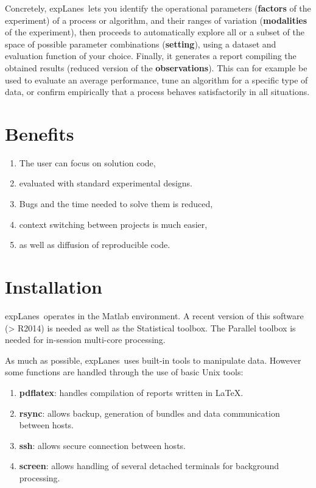 \documentclass[a4paper,fleqn]{tufte-handout}
\newcommand{\explanes}{\textsf{expLanes}\ }
\begin{document}
Concretely, \explanes lets you identify the operational parameters (\textbf{factors} of the experiment) of a process or algorithm, and their ranges of variation (\textbf{modalities} of the experiment), then proceeds to automatically explore all or a subset of the space of possible parameter combinations (\textbf{setting}), using a dataset and evaluation function of your choice. Finally, it generates a report compiling the obtained results (reduced version of the \textbf{observations}). This can for example be used to evaluate an average performance, tune an algorithm for a specific type of data, or confirm empirically that a process behaves satisfactorily in all situations.

\section{Benefits} 
\hypertarget{benefits}{} 

\begin{enumerate}
\item The user can focus on solution code,
\item evaluated with standard experimental designs.
\item Bugs and the time needed to solve them is reduced,
\item context switching between projects is much easier,
\item as well as diffusion of reproducible code.
\end{enumerate}

\section{Installation}
\hypertarget{installation}{} 

\explanes operates in the Matlab environment. A recent version of this software (> R2014) is needed as well as the Statistical toolbox. The Parallel toolbox is needed for in-session multi-core processing. 

As much as possible, \explanes uses built-in tools to manipulate data. However some functions are handled through the use of basic Unix tools:
\begin{enumerate}
\item \textbf{pdflatex}: handles compilation of reports written in \LaTeX.
\item \textbf{rsync}: allows backup, generation of bundles and data communication between hosts.
\item \textbf{ssh}: allows secure connection between hosts.
\item \textbf{screen}: allows handling of several detached terminals for background processing.
\end{enumerate}
\end{document}
